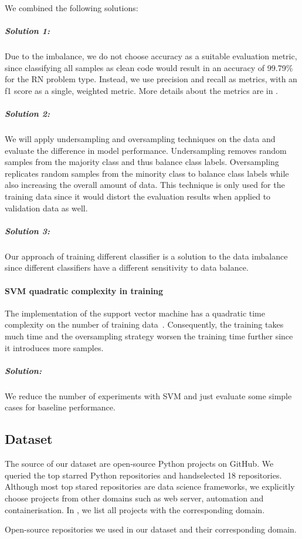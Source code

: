 We combined the following solutions:
\subparagraph{Solution 1:}
Due to the imbalance, we do not choose accuracy as a suitable evaluation metric, since classifying all samples as clean code would result in an accuracy of 99.79\% for the RN problem type. Instead, we use precision and recall as metrics, with an f1 score as a single, weighted metric. More details about the metrics are in .

\subparagraph{Solution 2:}
We will apply undersampling and oversampling techniques on the data and evaluate the difference in model performance. Undersampling removes random samples from the majority class and thus balance class labels. Oversampling replicates random samples from the minority class to balance class labels while also increasing the overall amount of data. This technique is only used for the training data since it would distort the evaluation results when applied to validation data as well.

\subparagraph{Solution 3:}
Our approach of training different classifier is a solution to the data imbalance since different classifiers have a different sensitivity to data balance. 

\paragraph{SVM quadratic complexity in training}\label{sec:svm_quadratic_complexity}
The implementation of the support vector machine has a quadratic time complexity on the number of training data~\cite{abdiansah_time_2015}. Consequently, the training takes much time and the oversampling strategy worsen the training time further since it introduces more samples.
\subparagraph{Solution:}
We reduce the number of experiments with SVM and just evaluate some simple cases for baseline performance. 


\subsection{Dataset}\label{chap:clean_code_classification_dataset}
The source of our dataset are open-source Python projects on GitHub. We queried the top starred Python repositories and handselected 18 repositories. Although most top stared repositories are data science frameworks, we explicitly choose projects from other domains such as web server, automation and containerisation. In , we list all projects with the corresponding domain.
\begin{table}[h]
    \centering
    \caption{Open-source repositories we used in our dataset and their corresponding domain. }
    \label{tab:repos_domains}
\end{table}

